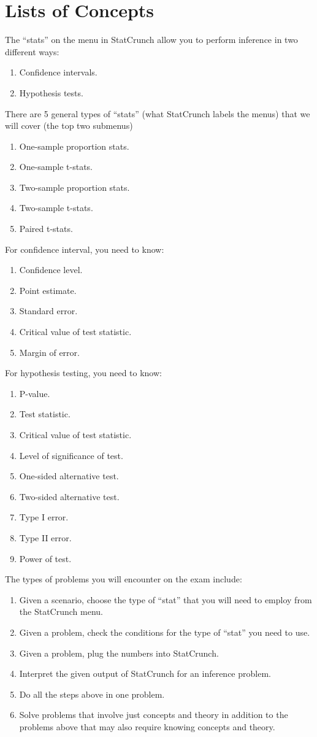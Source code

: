\documentclass{article}
\begin{document}
\section{Lists of Concepts}
The ``stats'' on the menu in StatCrunch allow you to perform inference
in two different ways:
  \begin{enumerate}
  \item Confidence intervals.
  \item Hypothesis tests.
  \end{enumerate}
There are 5 general types of ``stats'' (what StatCrunch labels the
menus) that we will cover (the top two submenus)
\begin{enumerate}
\item One-sample proportion stats.
\item One-sample t-stats.
\item Two-sample proportion stats.
\item Two-sample t-stats.
\item Paired t-stats.
\end{enumerate}
For confidence interval, you need to know:
\begin{enumerate}
\item Confidence level.
\item Point estimate.
\item Standard error.
\item Critical value of test statistic.
\item Margin of error.
\end{enumerate}
For hypothesis testing, you need to know:
\begin{enumerate}
\item P-value.
\item Test statistic.
\item Critical value of test statistic.
\item Level of significance of test.
\item One-sided alternative test.
\item Two-sided alternative test.
\item Type I error.
\item Type II error.
\item Power of test.
  \end{enumerate}
The types of problems you will encounter on the exam include:
\begin{enumerate}
\item Given a scenario, choose the type of ``stat'' that you will need
  to employ from the StatCrunch menu.
\item Given a problem, check the conditions for the type of ``stat''
  you need to use.
\item Given a problem, plug the numbers into StatCrunch.
\item Interpret the given output of StatCrunch for an inference problem.
\item Do all the steps above in one problem.
\item Solve problems that involve just concepts and theory in addition
  to the problems above that may also require knowing concepts and
  theory.
\end{enumerate}
\end{document}

